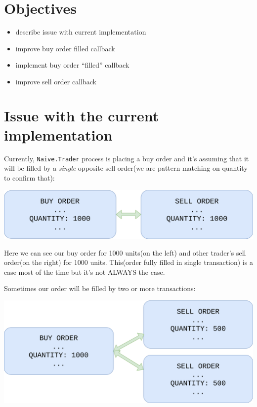 \documentclass[
  oneside]{book}
\providecommand{\tightlist}{%
  \setlength{\itemsep}{0pt}\setlength{\parskip}{0pt}}
\begin{document}
\hypertarget{objectives-7}{%
\section{Objectives}\label{objectives-7}}

\begin{itemize}
\tightlist
\item
  describe issue with current implementation
\item
  improve buy order filled callback
\item
  implement buy order ``filled'' callback
\item
  improve sell order callback
\end{itemize}

\hypertarget{issue-with-the-current-implementation}{%
\section{Issue with the current implementation}\label{issue-with-the-current-implementation}}

Currently, \texttt{Naive.Trader} process is placing a buy order and it's assuming that it will be filled by a \emph{single} opposite sell order(we are pattern matching on quantity to confirm that):

\includegraphics{images/chapter_08_01_single_transaction.png}

Here we can see our buy order for 1000 units(on the left) and other trader's sell order(on the right) for 1000 units. This(order fully filled in single transaction) is a case most of the time but it's not ALWAYS the case.

Sometimes our order will be filled by two or more transactions:

\includegraphics{images/chapter_08_02_multiple_transactions_per_order.png}
\end{document}
